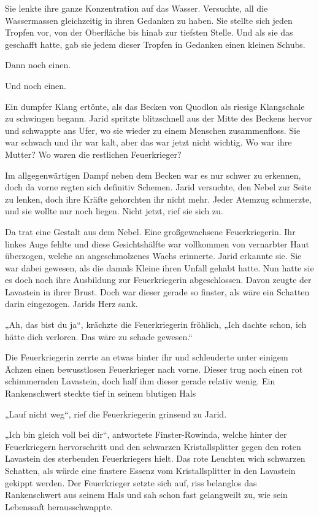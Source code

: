 Sie lenkte ihre ganze Konzentration auf das Wasser. Versuchte, all die Wassermassen gleichzeitig in ihren Gedanken zu haben. Sie stellte sich jeden Tropfen vor, von der Oberfläche bis hinab zur tiefsten Stelle. Und als sie das geschafft hatte, gab sie jedem dieser Tropfen in Gedanken einen kleinen Schubs.

Dann noch einen.

Und noch einen.

Ein dumpfer Klang ertönte, als das Becken von Quodlon als riesige Klangschale zu schwingen begann. Jarid spritzte blitzschnell aus der Mitte des Beckens hervor und schwappte ans Ufer, wo sie wieder zu einem Menschen zusammenfloss. Sie war schwach und ihr war kalt, aber das war jetzt nicht wichtig. Wo war ihre Mutter? Wo waren die restlichen Feuerkrieger?

Im allgegenwärtigen Dampf neben dem Becken war es nur schwer zu erkennen, doch da vorne regten sich definitiv Schemen. Jarid versuchte, den Nebel zur Seite zu lenken, doch ihre Kräfte gehorchten ihr nicht mehr. Jeder Atemzug schmerzte, und sie wollte nur noch liegen. Nicht jetzt, rief sie sich zu.

Da trat eine Gestalt aus dem Nebel. Eine großgewachsene Feuerkriegerin. Ihr linkes Auge fehlte und diese Gesichtshälfte war vollkommen von vernarbter Haut überzogen, welche an angeschmolzenes Wachs erinnerte. Jarid erkannte sie. Sie war dabei gewesen, als die damals Kleine ihren Unfall gehabt hatte. Nun hatte sie es doch noch ihre Ausbildung zur Feuerkriegerin abgeschlossen. Davon zeugte der Lavastein in ihrer Brust. Doch war dieser gerade so finster, als wäre ein Schatten darin eingezogen. Jarids Herz sank.

„Ah, das bist du ja“, krächzte die Feuerkriegerin fröhlich, „Ich dachte schon, ich hätte dich verloren. Das wäre zu schade gewesen.“

Die Feuerkriegerin zerrte an etwas hinter ihr und schleuderte unter einigem Ächzen einen bewusstlosen Feuerkrieger nach vorne. Dieser trug noch einen rot schimmernden Lavastein, doch half ihm dieser gerade relativ wenig. Ein Rankenschwert steckte tief in seinem blutigen Hals

„Lauf nicht weg“, rief die Feuerkriegerin grinsend zu Jarid.

„Ich bin gleich voll bei dir“, antwortete Finster-Rowinda, welche hinter der Feuerkriegern hervorschritt und den schwarzen Kristallsplitter gegen den roten Lavastein des sterbenden Feuerkriegers hielt. Das rote Leuchten wich schwarzen Schatten, als würde eine finstere Essenz vom Kristallsplitter in den Lavastein gekippt werden. Der Feuerkrieger setzte sich auf, riss belanglos das Rankenschwert aus seinem Hals und sah schon fast gelangweilt zu, wie sein Lebenssaft herausschwappte.


